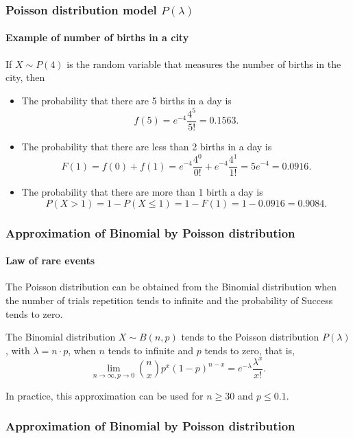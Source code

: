 \begin{frame}
\frametitle{Poisson distribution model $P(\lambda)$}
\framesubtitle{Example of number of births in a city}
If $X\sim P(4)$ is the random variable that measures the number of births in the city, then
\begin{itemize}
\item The probability that there are 5 births in a day is
\[
f(5) = e^{-4}\frac{4^5}{5!} = 0.1563.
\]
\item The probability that there are less than 2 births in a day is
\[
F(1) = f(0)+f(1) = e^{-4}\frac{4^0}{0!} + e^{-4}\frac{4^1}{1!} = 5e^{-4} = 0.0916.
\]
\item The probability that there are more than 1 birth a day is 
\[
P(X>1) = 1-P(X\leq 1) = 1-F(1) = 1-0.0916 = 0.9084.
\]
\end{itemize}
\end{frame}


\begin{frame}
\frametitle{Approximation of Binomial by Poisson distribution}
\framesubtitle{Law of rare events}
The Poisson distribution can be obtained from the Binomial distribution when the number of trials repetition tends to
infinite and the probability of Success tends to zero. 

\begin{theorem}
The Binomial distribution $X\sim B(n,p)$ tends to the Poisson distribution $P(\lambda)$, with $\lambda=n\cdot p$, when
$n$ tends to infinite and $p$ tends to zero, that is,
\[
\lim_{n\rightarrow \infty, p\rightarrow 0}\binom{n}{x}p^x(1-p)^{n-x} = e^{-\lambda}\frac{\lambda^x}{x!}.
\]
\end{theorem}

In practice, this approximation can be used for $n\geq 30$ and $p\leq 0.1$.
\end{frame}


\begin{frame}
\frametitle{Approximation of Binomial by Poisson distribution}
\begin{center}
\end{center}
\end{frame}


